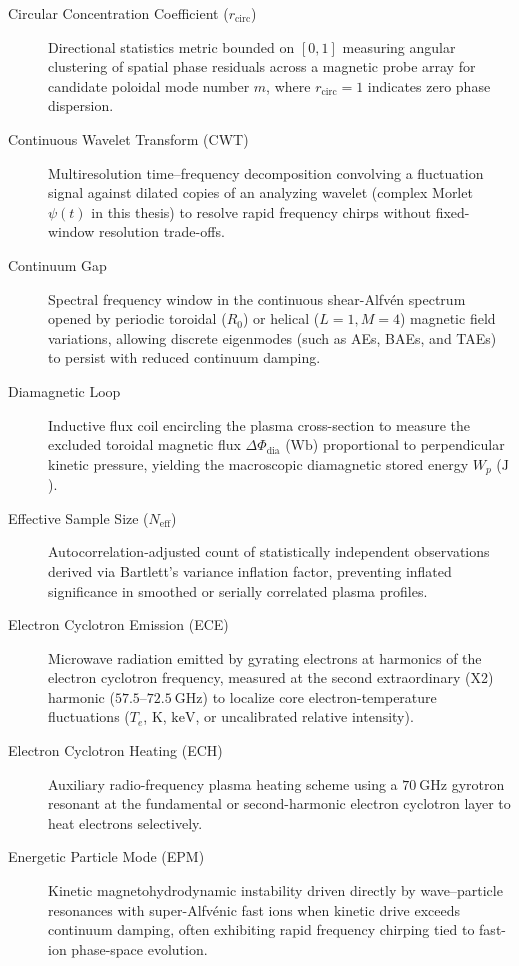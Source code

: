 \begin{description}
\item[Circular Concentration Coefficient ($r_{\mathrm{circ}}$)] Directional statistics metric bounded on $[0, 1]$ measuring angular clustering of spatial phase residuals across a magnetic probe array for candidate poloidal mode number $m$, where $r_{\mathrm{circ}} = 1$ indicates zero phase dispersion.

\item[Continuous Wavelet Transform (CWT)] Multiresolution time--frequency decomposition convolving a fluctuation signal against dilated copies of an analyzing wavelet (complex Morlet $\psi(t)$ in this thesis) to resolve rapid frequency chirps without fixed-window resolution trade-offs.

\item[Continuum Gap] Spectral frequency window in the continuous shear-Alfv\'{e}n spectrum opened by periodic toroidal ($R_0$) or helical ($L=1, M=4$) magnetic field variations, allowing discrete eigenmodes (such as AEs, BAEs, and TAEs) to persist with reduced continuum damping.

\item[Diamagnetic Loop] Inductive flux coil encircling the plasma cross-section to measure the excluded toroidal magnetic flux $\Delta\Phi_{\mathrm{dia}}$ ($\mathrm{Wb}$) proportional to perpendicular kinetic pressure, yielding the macroscopic diamagnetic stored energy $W_p$ ($\mathrm{J}$).

\item[Effective Sample Size ($N_{\mathrm{eff}}$)] Autocorrelation-adjusted count of statistically independent observations derived via Bartlett's variance inflation factor, preventing inflated significance in smoothed or serially correlated plasma profiles.

\item[Electron Cyclotron Emission (ECE)] Microwave radiation emitted by gyrating electrons at harmonics of the electron cyclotron frequency, measured at the second extraordinary (X2) harmonic ($57.5\text{--}72.5~\mathrm{GHz}$) to localize core electron-temperature fluctuations ($T_e$, $\mathrm{K}$, $\mathrm{keV}$, or uncalibrated relative intensity).

\item[Electron Cyclotron Heating (ECH)] Auxiliary radio-frequency plasma heating scheme using a $70~\mathrm{GHz}$ gyrotron resonant at the fundamental or second-harmonic electron cyclotron layer to heat electrons selectively.

\item[Energetic Particle Mode (EPM)] Kinetic magnetohydrodynamic instability driven directly by wave--particle resonances with super-Alfv\'{e}nic fast ions when kinetic drive exceeds continuum damping, often exhibiting rapid frequency chirping tied to fast-ion phase-space evolution.


\end{description}
